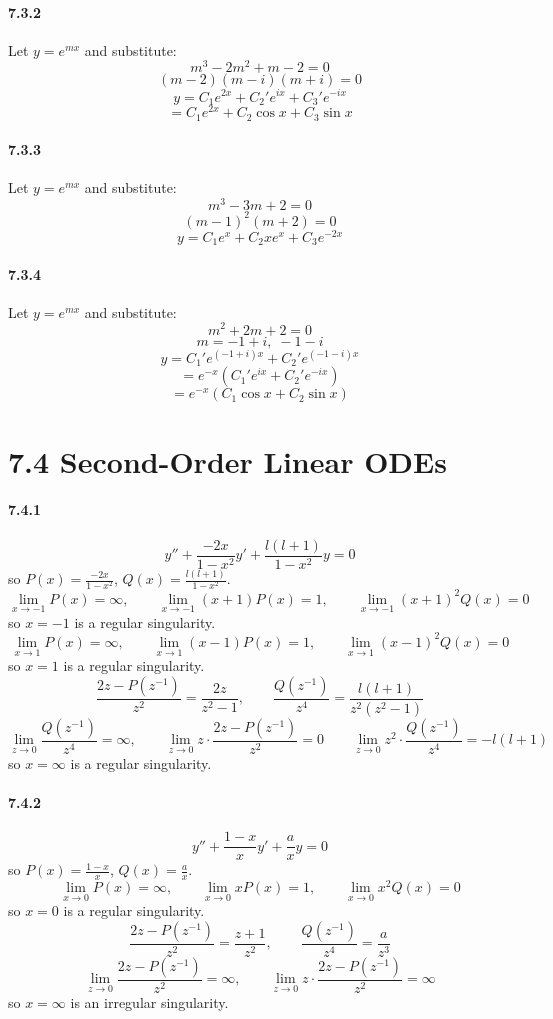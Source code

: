 \documentclass[a4paper]{article}
\begin{document}
\paragraph{7.3.2}
Let $y=e^{mx}$ and substitute:
\[
m^3-2m^2+m-2=0
\]
\[
(m-2)(m-i)(m+i)=0
\]
\[
y=C_1e^{2x}+C_2'e^{ix}+C_3'e^{-ix}
\]
\[
=C_1e^{2x}+C_2\cos x+C_3\sin x
\]

\paragraph{7.3.3}
Let $y=e^{mx}$ and substitute:
\[
m^3-3m+2=0
\]
\[
(m-1)^2(m+2)=0
\]
\[
y=C_1e^x+C_2xe^x+C_3e^{-2x}
\]

\paragraph{7.3.4}
Let $y=e^{mx}$ and substitute:
\[
m^2+2m+2=0
\]
\[
m=-1+i,\;-1-i
\]
\[
y=C_1'e^{(-1+i)x}+C_2'e^{(-1-i)x}
\]
\[
=e^{-x}(C_1'e^{ix}+C_2'e^{-ix})
\]
\[
= e^{-x}(C_1\cos x+C_2\sin x)
\]

\section*{7.4 Second-Order Linear ODEs}

\paragraph{7.4.1}
\[
y''+\frac{-2x}{1-x^2}y'+\frac{l(l+1)}{1-x^2}y=0
\]
so $P(x)=\frac{-2x}{1-x^2}$,\; $Q(x)=\frac{l(l+1)}{1-x^2}$.
\[
\lim_{x\to -1}P(x)=\infty,\qquad\lim_{x\to -1}(x+1)P(x)=1,\qquad\lim_{x\to -1}(x+1)^2Q(x)=0
\]
so $x=-1$ is a regular singularity.
\[
\lim_{x\to 1}P(x)=\infty,\qquad\lim_{x\to 1}(x-1)P(x)=1,\qquad\lim_{x\to 1}(x-1)^2Q(x)=0
\]
so $x=1$ is a regular singularity.
\[
\frac{2z-P(z^{-1})}{z^2}=\frac{2z}{z^2-1},\qquad\frac{Q(z^{-1})}{z^4}=\frac{l(l+1)}{z^2(z^2-1)}
\]
\[
\lim_{z\to0}\frac{Q(z^{-1})}{z^4}=\infty,\qquad\lim_{z\to0}z\cdot\frac{2z-P(z^{-1})}{z^2}=0\qquad\lim_{z\to0}z^2\cdot\frac{Q(z^{-1})}{z^4}=-l(l+1)
\]
so $x=\infty$ is a regular singularity.

\paragraph{7.4.2}
\[
y''+\frac{1-x}{x}y'+\frac{a}{x}y=0
\]
so $P(x)=\frac{1-x}{x}$,\; $Q(x)=\frac{a}{x}$.
\[
\lim_{x\to0}P(x)=\infty,\qquad\lim_{x\to0}xP(x)=1,\qquad\lim_{x\to0}x^2Q(x)=0
\]
so $x=0$ is a regular singularity.
\[
\frac{2z-P(z^{-1})}{z^2}=\frac{z+1}{z^2},\qquad\frac{Q(z^{-1})}{z^4}=\frac{a}{z^3}
\]
\[
\lim_{z\to0}\frac{2z-P(z^{-1})}{z^2}=\infty,\qquad\lim_{z\to0}z\cdot\frac{2z-P(z^{-1})}{z^2}=\infty
\]
so $x=\infty$ is an irregular singularity.
\end{document}
